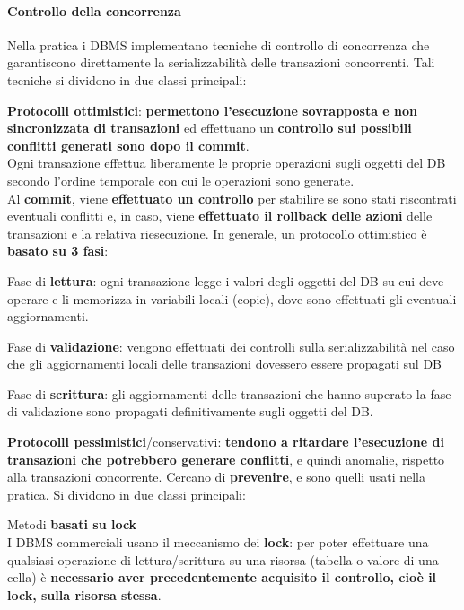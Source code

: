 \documentclass[10pt]{book}
\begin{document}
\paragraph{Controllo della concorrenza} Nella pratica i DBMS implementano tecniche di controllo di concorrenza che garantiscono direttamente la serializzabilità delle transazioni concorrenti. Tali tecniche si dividono in due classi principali:
\begin{list}{}{}
	\item \textbf{Protocolli ottimistici}: \textbf{permettono l'esecuzione sovrapposta e non sincronizzata di transazioni} ed effettuano un \textbf{controllo sui possibili conflitti generati sono dopo il commit}.\\
	Ogni transazione effettua liberamente le proprie operazioni sugli oggetti del DB secondo l'ordine temporale con cui le operazioni sono generate.\\
	Al \textbf{commit}, viene \textbf{effettuato un controllo} per stabilire se sono stati riscontrati eventuali conflitti e, in caso, viene \textbf{effettuato il rollback delle azioni} delle transazioni e la relativa riesecuzione. In generale, un protocollo ottimistico è \textbf{basato su 3 fasi}:
	\begin{list}{}{}
		\item Fase di \textbf{lettura}: ogni transazione legge i valori degli oggetti del DB su cui deve operare e li memorizza in variabili locali (copie), dove sono effettuati gli eventuali aggiornamenti.
		\item Fase di \textbf{validazione}: vengono effettuati dei controlli sulla serializzabilità nel caso che gli aggiornamenti locali delle transazioni dovessero essere propagati sul DB
		\item Fase di \textbf{scrittura}: gli aggiornamenti delle transazioni che hanno superato la fase di validazione sono propagati definitivamente sugli oggetti del DB.
	\end{list}
	\item \textbf{Protocolli pessimistici}/conservativi: \textbf{tendono a ritardare l'esecuzione di transazioni che potrebbero generare conflitti}, e quindi anomalie, rispetto alla transazioni concorrente. Cercano di \textbf{prevenire}, e sono quelli usati nella pratica. Si dividono in due classi principali:
	\begin{list}{}{}
		\item Metodi \textbf{basati su lock}\\
		I DBMS commerciali usano il meccanismo dei \textbf{lock}: per poter effettuare una qualsiasi operazione di lettura/scrittura su una risorsa (tabella o valore di una cella) è \textbf{necessario aver precedentemente acquisito il controllo, cioè il lock, sulla risorsa stessa}.

\end{list}
\end{list}
\end{document}

